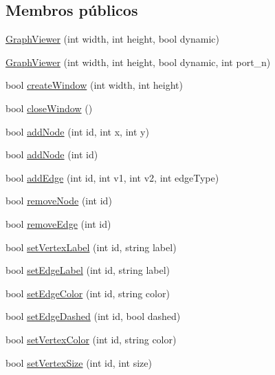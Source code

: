 \subsection*{Membros públicos}
\begin{DoxyCompactItemize}
\item 
\hyperlink{class_graph_viewer_a8adc614f4fc290a3efcec7d7ceb1c58a}{Graph\+Viewer} (int width, int height, bool dynamic)
\item 
\hyperlink{class_graph_viewer_ad9d7b1d8b4ba8ef18517eae0e68568a2}{Graph\+Viewer} (int width, int height, bool dynamic, int port\+\_\+n)
\item 
bool \hyperlink{class_graph_viewer_ae5247dc66449dcd21fc5d531bbbaddfa}{create\+Window} (int width, int height)
\item 
bool \hyperlink{class_graph_viewer_a85990c1eaac7feed3950960d4bd2fd4c}{close\+Window} ()
\item 
bool \hyperlink{class_graph_viewer_a5421e86ac76433876309236ba96e70a2}{add\+Node} (int id, int x, int y)
\item 
bool \hyperlink{class_graph_viewer_ab9be856eb5f45284719a3bb119ec01ea}{add\+Node} (int id)
\item 
bool \hyperlink{class_graph_viewer_aad0c1448c37f744209ffb671f1bd0015}{add\+Edge} (int id, int v1, int v2, int edge\+Type)
\item 
bool \hyperlink{class_graph_viewer_a0c418639bb911eb827cabf895915f775}{remove\+Node} (int id)
\item 
bool \hyperlink{class_graph_viewer_a9a8ee68c7c12b373affbe4069dd95d72}{remove\+Edge} (int id)
\item 
bool \hyperlink{class_graph_viewer_ac25d7d007022fda16799808ba136e909}{set\+Vertex\+Label} (int id, string label)
\item 
bool \hyperlink{class_graph_viewer_a447cca0064e785654c2105602c2961ca}{set\+Edge\+Label} (int id, string label)
\item 
bool \hyperlink{class_graph_viewer_a07ccc96707efae4aa5f3ced3dca015af}{set\+Edge\+Color} (int id, string color)
\item 
bool \hyperlink{class_graph_viewer_a1698f1c6b3a8e7cabc7b7d7cf42fc7f0}{set\+Edge\+Dashed} (int id, bool dashed)
\item 
bool \hyperlink{class_graph_viewer_a8b542d7e09e81a45a74760c19233beb0}{set\+Vertex\+Color} (int id, string color)
\item 
bool \hyperlink{class_graph_viewer_ae930dfdfcdeb7a871eefb6028d74b9f9}{set\+Vertex\+Size} (int id, int size)
\item 

\end{DoxyCompactItemize}
